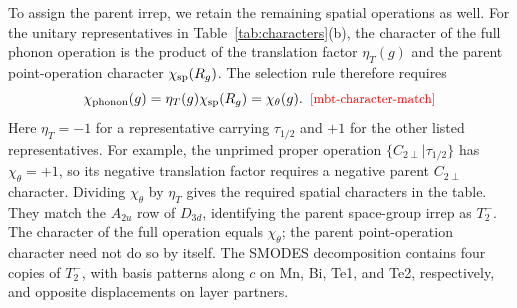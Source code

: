 \documentclass[galley,aps,pra,10pt,amsmath,amssymb,
    superscriptaddress,nofootinbib,longbibliography]{revtex4-2}
\def\Red#1{\textcolor{red}{#1}}
\newcounter{comm}
\newcommand{\eqlab}[1]{\Red{\hbox{\small\;\;[#1]}}\label{eq:#1}}
\newcommand{\eqlab}[1]{\label{eq:#1}}
\newcommand{\code}[1]{\textsc{#1}}
\begin{document}
To assign the parent irrep, we retain the remaining spatial operations as well. For the unitary representatives in Table~\ref{tab:characters}(b), the character of the full phonon operation is the product of the translation factor $\eta_T(g)$ and the parent point-operation character $\chi_{\rm sp}(R_g)$. The selection rule therefore requires
\begin{equation}
\chi_{\rm phonon}(g)
=\eta_T(g)\chi_{\rm sp}(R_g)
=\chi_\theta(g).
\eqlab{mbt-character-match}
\end{equation}
Here $\eta_T=-1$ for a representative carrying $\tau_{1/2}$ and $+1$ for the other listed representatives. For example, the unprimed proper operation $\{C_{2\perp}|\tau_{1/2}\}$ has $\chi_\theta=+1$, so its negative translation factor requires a negative parent $C_{2\perp}$ character. Dividing $\chi_\theta$ by $\eta_T$ gives the required spatial characters in the table. They match the $A_{2u}$ row of $D_{3d}$, identifying the parent space-group irrep as $T_2^-$. The character of the full operation equals $\chi_\theta$; the parent point-operation character need not do so by itself. The \code{SMODES} decomposition contains four copies of $T_2^-$, with basis patterns along $c$ on Mn, Bi, Te1, and Te2, respectively, and opposite displacements on layer partners.
\end{document}
